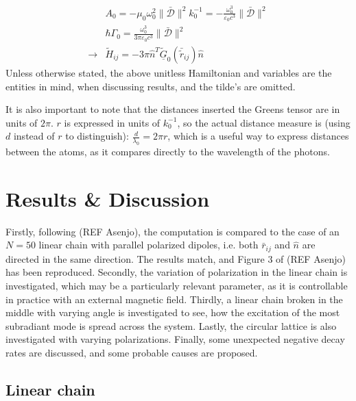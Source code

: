 \documentclass{article}
\begin{document}
\begin{equation}\label{eq:Hamiltonian_unitless}
    \begin{split}
        &A_0 = -\mu_0 \omega_0^2 \| \bar{\mathscr{D}} \|^2 k_0^{-1} = - \frac{\omega_0^3}{\varepsilon_0 c^3} \| \bar{\mathscr{D}} \|^2 \\
        &\hbar \Gamma_0 = \frac{\omega_0^3}{3\pi \varepsilon_0 c^3} \| \bar{\mathscr{D}} \|^2 \\
        \longrightarrow & \tilde{H}_{ij} = -3 \pi \hat{n}^T \underline{\tilde{G}}_0 (\bar{\tilde{r}}_{ij}) \hat{n}
    \end{split}
\end{equation}
Unless otherwise stated, the above unitless Hamiltonian and variables are the entities in mind, when discussing results, and the tilde's are omitted. 

It is also important to note that the distances inserted the Greens tensor are in units of $2\pi$. $r$ is expressed in units of $k_0^{-1}$, so the actual distance measure is (using $d$ instead of $r$ to distinguish): $\frac{d}{\lambda_0} = 2 \pi r$, which is a useful way to express distances between the atoms, as it compares directly to the wavelength of the photons. 

\section{Results \& Discussion}

Firstly, following (REF Asenjo), the computation is compared to the case of an $N=50$ linear chain with parallel polarized dipoles, i.e. both $\bar{r}_{ij}$ and $\hat{n}$ are directed in the same direction. The results match, and Figure 3 of (REF Asenjo) has been reproduced. Secondly, the variation of polarization in the linear chain is investigated, which may be a particularly relevant parameter, as it is controllable in practice with an external magnetic field. Thirdly, a linear chain broken in the middle with varying angle is investigated to see, how the excitation of the most subradiant mode is spread across the system. Lastly, the circular lattice is also investigated with varying polarizations. Finally, some unexpected negative decay rates are discussed, and some probable causes are proposed. 

\subsection{Linear chain}\label{disc:linear_chain}
\end{document}
